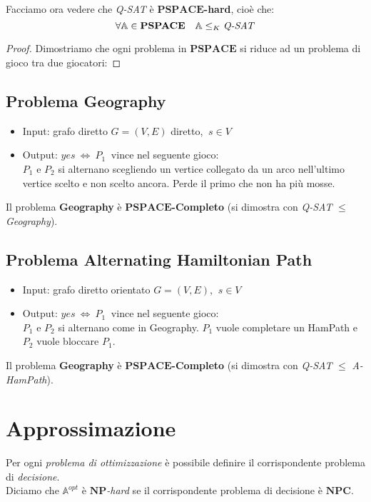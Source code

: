 \documentclass[a4paper]{article}
\theoremstyle{definition}
\newcommand{\np}{\mathbf{NP}}
\newcommand{\npc}{\mathbf{NPC}}
\newcommand{\pspace}{\mathbf{PSPACE}}
\newcommand{\prob}[1]{\mathbb{#1}}
\begin{document}
	 Facciamo ora vedere che \textit{Q-SAT} è $ \pspace$\textbf{-hard}, cioè che:
	 \[
		 \forall \prob{A}\in \pspace\quad \prob{A}\leq_K \text{\textit{Q-SAT}}
	 \]
	 
	 \begin{proof}
	 	Dimostriamo che ogni problema in $ \pspace $ si riduce ad un problema di gioco tra due giocatori:
	 	
	 \end{proof}
		
		\subsection{Problema Geography}
			\begin{itemize}
				\item Input: grafo diretto $ G = (V, E) $ diretto, $ \ s \in V $
				\item Output: $ yes \ \Leftrightarrow\ P_1 \ $ vince nel seguente gioco:\\
				$ P_1 $ e $ P_2 $ si alternano scegliendo un vertice collegato da un arco nell'ultimo vertice scelto e non scelto ancora. Perde il primo che non ha più mosse.
			\end{itemize}
		
		\noindent
		Il problema \textbf{Geography} è $\pspace$\textbf{-Completo} (si dimostra con \textit{Q-SAT} $\leq$ \textit{Geography}).
		
		\subsection{Problema Alternating Hamiltonian Path}
			\begin{itemize}
				\item Input: grafo diretto orientato $ G = (V, E) $, $ \ s\in V $
				\item Output: $ yes\ \Leftrightarrow\ P_1 \ $ vince nel seguente gioco:\\
				$ P_1 $ e $ P_2 $ si alternano come in Geography. $ P_1 $ vuole completare un HamPath e $ P_2 $ vuole bloccare $ P_1 $.
			\end{itemize}
		
		\noindent
		Il problema \textbf{Geography} è $\pspace$\textbf{-Completo} (si dimostra con \textit{Q-SAT} $\leq$ \textit{A-HamPath}).
		
		
	\section{Approssimazione}
		Per ogni \textit{problema di ottimizzazione} è possibile definire il corrispondente problema di \textit{decisione}.\\
		Diciamo che $\mathbb{A}^{opt}$ è $\np$\textit{-hard} se il corrispondente problema di decisione è $\npc$.
		
\end{document}
